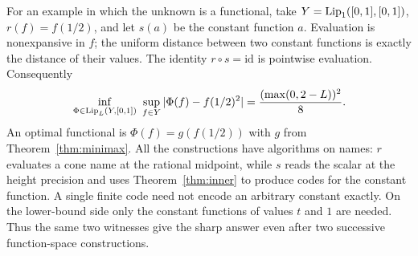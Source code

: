 For an example in which the unknown is a functional, take $Y=\operatorname{Lip}_1([0,1],[0,1])$, $r(f)=f(1/2)$, and let $s(a)$ be the constant function $a$. Evaluation is nonexpansive in $f$; the uniform distance between two constant functions is exactly the distance of their values. The identity $r\circ s=\mathrm{id}$ is pointwise evaluation. Consequently
\[
 \inf_{\Phi\in\operatorname{Lip}_L(Y,[0,1])}\ \sup_{f\in Y}
       |\Phi(f)-f(1/2)^2|=\frac{(\max(0,2-L))^2}{8}.
\]
An optimal functional is $\Phi(f)=g(f(1/2))$ with $g$ from Theorem~\ref{thm:minimax}. All the constructions have algorithms on names: $r$ evaluates a cone name at the rational midpoint, while $s$ reads the scalar at the height precision and uses Theorem~\ref{thm:inner} to produce codes for the constant function. A single finite code need not encode an arbitrary constant exactly. On the lower-bound side only the constant functions of values $t$ and $1$ are needed. Thus the same two witnesses give the sharp answer even after two successive function-space constructions.
